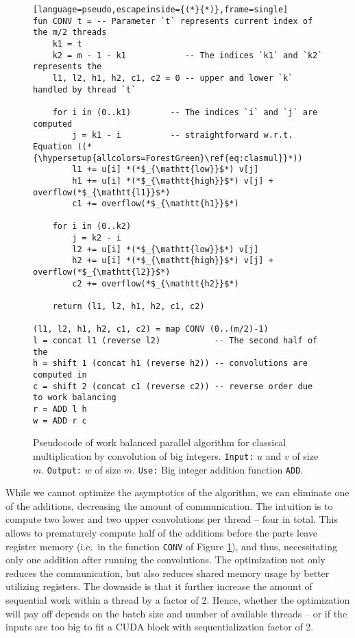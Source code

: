 \begin{figure}[H]
\begin{lstlisting}[language=pseudo,escapeinside={(*}{*)},frame=single]
fun CONV t = -- Parameter `t` represents current index of the m/2 threads
    k1 = t
    k2 = m - 1 - k1            -- The indices `k1` and `k2` represents the
    l1, l2, h1, h2, c1, c2 = 0 -- upper and lower `k` handled by thread `t`

    for i in (0..k1)        -- The indices `i` and `j` are computed
        j = k1 - i          -- straightforward w.r.t. Equation ((*{\hypersetup{allcolors=ForestGreen}\ref{eq:clasmul}}*))
        l1 += u[i] *(*$_{\mathtt{low}}$*) v[j]
        h1 += u[i] *(*$_{\mathtt{high}}$*) v[j] + overflow(*$_{\mathtt{l1}}$*)
        c1 += overflow(*$_{\mathtt{h1}}$*)

    for i in (0..k2)
        j = k2 - i
        l2 += u[i] *(*$_{\mathtt{low}}$*) v[j]
        h2 += u[i] *(*$_{\mathtt{high}}$*) v[j] + overflow(*$_{\mathtt{l2}}$*)
        c2 += overflow(*$_{\mathtt{h2}}$*)

    return (l1, l2, h1, h2, c1, c2)

(l1, l2, h1, h2, c1, c2) = map CONV (0..(m/2)-1)
l = concat l1 (reverse l2)           -- The second half of the
h = shift 1 (concat h1 (reverse h2)) -- convolutions are computed in
c = shift 2 (concat c1 (reverse c2)) -- reverse order due to work balancing
r = ADD l h
w = ADD r c
\end{lstlisting}
  \caption{\footnotesize Pseudocode of work balanced parallel algorithm for classical multiplication by convolution of big integers. \texttt{Input:} $u$ and $v$ of size $m$. \texttt{Output:} $w$ of size $m$. \texttt{Use:} Big integer addition function \texttt{ADD}.}
  \label{fig:mulparalg}
\end{figure}

While we cannot optimize the asymptotics of the algorithm, we can eliminate one
of the additions, decreasing the amount of communication. The intuition is to
compute two lower and two upper convolutions per thread -- four in total. This
allows to prematurely compute half of the additions before the parts leave
register memory (i.e.\ in the function \texttt{CONV} of Figure
\ref{fig:mulparalg}), and thus, necessitating only one addition after running
the convolutions. The optimization not only reduces the communication, but also
reduces shared memory usage by better utilizing registers. The downside is that
it further increase the amount of sequential work within a thread by a factor of
2. Hence, whether the optimization will pay off depends on the batch size and
number of available threads -- or if the inputs are too big to fit a CUDA block
with sequentialization factor of 2.

